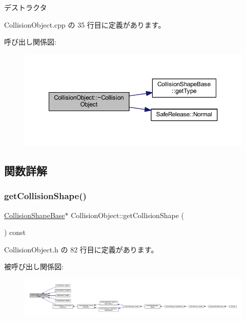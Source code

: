 デストラクタ 



 Collision\+Object.\+cpp の 35 行目に定義があります。

呼び出し関係図\+:\nopagebreak
\begin{figure}[H]
\begin{center}
\leavevmode
\includegraphics[width=350pt]{class_collision_object_a8c4e6916bc5911b8a82498536d5a27e1_cgraph}
\end{center}
\end{figure}


\subsection{関数詳解}
\mbox{\label{class_collision_object_a3ff1c2d794f520c96b6bc6037a8f8f8c}} 
\subsubsection{\texorpdfstring{get\+Collision\+Shape()}{getCollisionShape()}}
{\footnotesize\ttfamily \mbox{\hyperlink{class_collision_shape_base}{Collision\+Shape\+Base}}$\ast$ Collision\+Object\+::get\+Collision\+Shape (\begin{DoxyParamCaption}{ }\end{DoxyParamCaption}) const\hspace{0.3cm}{\ttfamily [inline]}}



 Collision\+Object.\+h の 82 行目に定義があります。

被呼び出し関係図\+:
\nopagebreak
\begin{figure}[H]
\begin{center}
\leavevmode
\includegraphics[width=350pt]{class_collision_object_a3ff1c2d794f520c96b6bc6037a8f8f8c_icgraph}
\end{center}
\end{figure}
\mbox{\label{class_collision_object_adb01187ec10302f13034407a3c852860}} 
